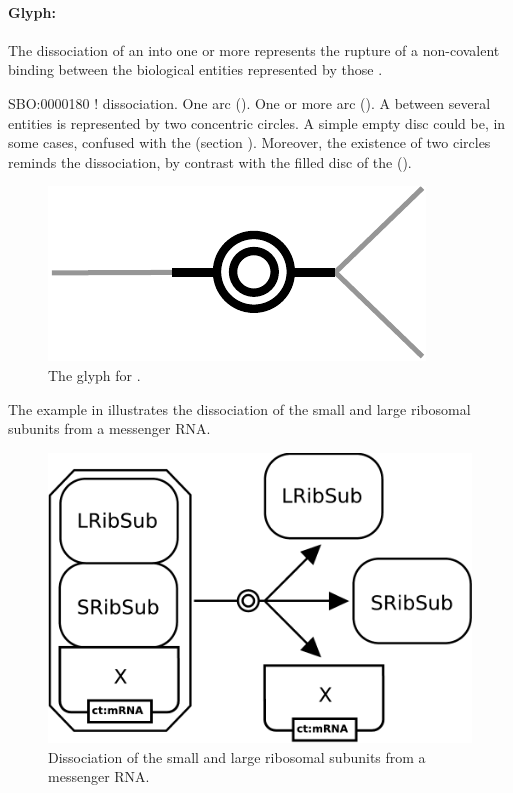 \paragraph{Glyph: }\label{sec:dissociation}

The dissociation of an  into one or more  represents the rupture of a non-covalent binding between the biological entities represented by those .

\begin{glyphDescription}
 \glyphSboTerm SBO:0000180 ! dissociation.
 \glyphOrigin One  arc ().
 \glyphTarget  One or more  arc ().
 \glyphNode A  between several entities is represented by two concentric circles. A simple empty disc could be, in some cases, confused with the  (section ). Moreover, the existence of two circles reminds the dissociation, by contrast with the filled disc of the  ().
 \end{glyphDescription}


\begin{figure}[H]
  \centering
  \includegraphics[scale = 0.5]{images/dissociation}
  \caption{The \PD glyph for .}
  \label{fig:dissociation}
\end{figure}

The example in  illustrates the dissociation of the small and large ribosomal subunits from a messenger RNA.

\begin{figure}[H]
  \centering
  \includegraphics[scale = 0.3]{examples/dissociation-ribosome}
  \caption{Dissociation of the small and large ribosomal subunits from a messenger RNA.}
  \label{fig:dissoc-ribo}
\end{figure}


